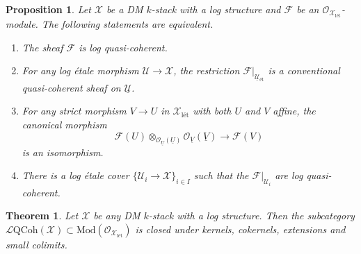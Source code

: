 \documentclass[10pt,a4paper]{amsart}
\newtheorem{proposition}{Proposition}
\newtheorem{theorem}{Theorem}
\newcommand{\cF}{\mathcal{F}}
\newcommand{\cL}{\mathcal{L}}
\newcommand{\cU}{\mathcal{U}}
\newcommand{\logqcoh}[1]{\cL \text{QCoh}(#1)}
\newcommand{\ul}[1]{\underline{#1}}
\begin{document}
\begin{proposition}\label{Prop-on-quasi-coherent-sheaves}
Let $\mathcal{X}$ be a DM $k$-stack with a log structure and $\mathcal{F}$ be an $\mathcal{O}_{\mathcal{X}_{\text{l\'et}}}$-module. The following statements are equivalent.
\begin{enumerate}
    \item \label{item-1-prop-quasi-coherent}
    The sheaf $\mathcal{F}$ is log quasi-coherent.
    \item\label{item-2-prop-quasi-coherent} For any log \'etale morphism $\mathcal{U}\rightarrow \mathcal{X}$, the restriction $\mathcal{F}|_{\ul{\mathcal{U}}{}_{\text{\'et}}}$ is a conventional quasi-coherent sheaf on $\underline{\mathcal{U}}$.
    \item\label{item-3-prop-quasi-coherent} For any strict morphism $V\rightarrow U$ in $\mathcal{X}_{\text{l\'et}}$ with both $U$ and $V$ affine, the canonical morphism
    $$\mathcal{F}(U)\otimes_{\mathcal{O}_{\ul{U}}(\ul{U})}\mathcal{O}_{\ul{V}}(\ul{V})\longrightarrow \mathcal{F}(V)$$
    is an isomorphism.
    \item\label{item-4-prop-quasi-coherent} There is a log \'etale cover $\{\mathcal{U}_i\rightarrow \mathcal{X}\}_{i\in I}$ such that the $\cF|_{\cU_i}$ are log quasi-coherent.
\end{enumerate}
\end{proposition}

\begin{theorem}\label{thm-category-of-quasi-coherent-sheaves}
Let $\mathcal{X}$ be any DM $k$-stack with a log structure. Then the subcategory $\logqcoh{\mathcal{X}}\subset \text{Mod}(\mathcal{O}_{\mathcal{X}_{\text{l\'et}}})$ is closed under kernels, cokernels, extensions and small colimits.
\end{theorem}
\end{document}
